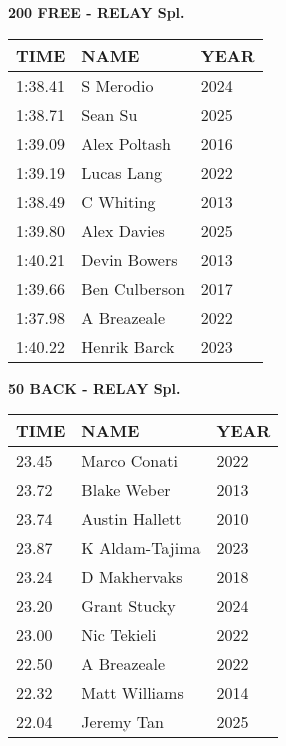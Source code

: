 \vspace{0.4cm}

\begin{center}
\begin{minipage}[t]{0.7\textwidth}
\centering
\textbf{200 FREE - RELAY Spl.}\\[0.05cm]
\begin{tabular}{@{}p{1.8cm}p{2.8cm}p{1.2cm}@{}}
\hline
\textbf{TIME} & \textbf{NAME} & \textbf{YEAR} \\
\hline
1:38.41 & S Merodio & 2024 \\
1:38.71 & Sean Su & 2025 \\
1:39.09 & Alex Poltash & 2016 \\
1:39.19 & Lucas Lang & 2022 \\
1:38.49 & C Whiting & 2013 \\
1:39.80 & Alex Davies & 2025 \\
1:40.21 & Devin Bowers & 2013 \\
1:39.66 & Ben Culberson & 2017 \\
1:37.98 & A Breazeale & 2022 \\
1:40.22 & Henrik Barck & 2023 \\
\hline
\end{tabular}
\end{minipage}
\end{center}

\vspace{0.4cm}

\begin{center}
\begin{minipage}[t]{0.7\textwidth}
\centering
\textbf{50 BACK - RELAY Spl.}\\[0.05cm]
\begin{tabular}{@{}p{1.8cm}p{2.8cm}p{1.2cm}@{}}
\hline
\textbf{TIME} & \textbf{NAME} & \textbf{YEAR} \\
\hline
23.45 & Marco Conati & 2022 \\
23.72 & Blake Weber & 2013 \\
23.74 & Austin Hallett & 2010 \\
23.87 & K Aldam-Tajima & 2023 \\
23.24 & D Makhervaks & 2018 \\
23.20 & Grant Stucky & 2024 \\
23.00 & Nic Tekieli & 2022 \\
22.50 & A Breazeale & 2022 \\
22.32 & Matt Williams & 2014 \\
22.04 & Jeremy Tan & 2025 \\
\hline
\end{tabular}
\end{minipage}
\end{center}

